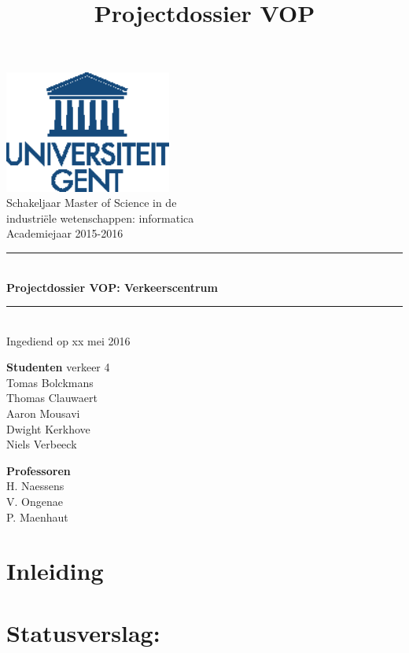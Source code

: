 \documentclass[a4paper]{article}
\title{Projectdossier VOP}
\newcommand{\HRule}{\rule{\linewidth}{0.5mm}}
\newcommand{\studenten} {Tomas Bolckmans \\Thomas Clauwaert\\Aaron Mousavi\\Dwight Kerkhove\\Niels Verbeeck}
\newcommand{\begeleiders}{H. Naessens\\V. Ongenae\\P. Maenhaut}
\newcommand{\titel}{Projectdossier VOP: Verkeerscentrum}
\newcommand{\datum}{xx mei 2016}
\newcommand{\academiejaar}{2015-2016}
\begin{document}
\begin{titlepage}
\begin{center}
\includegraphics[height=4cm]{Images/Ugentlogo.eps}\\[.5cm]

Schakeljaar Master of Science in de\\
industriële wetenschappen: informatica\\
Academiejaar \academiejaar{}

\vfill

\HRule \\[0.4cm]
{\huge \bfseries \titel{}}\\[0.4cm]
\HRule \\[0.4cm]


Ingediend op \datum{}

\vfill
\begin{minipage}{0.49\textwidth}
\begin{flushleft}
\textbf{Studenten} verkeer 4\\
\studenten{}
\end{flushleft}
\end{minipage}
\begin{minipage}{0.49\textwidth}
\begin{flushright}
\textbf{Professoren}\\
\begeleiders{}\\
\end{flushright}
\end{minipage}

\end{center}
\end{titlepage}

\tableofcontents
\newpage

\section{Inleiding}
\label{sec:inleiding}
\lipsum[56]

\section{Statusverslag:}
\label{sec:statusverslag}
\lipsum[56]
\end{document}
